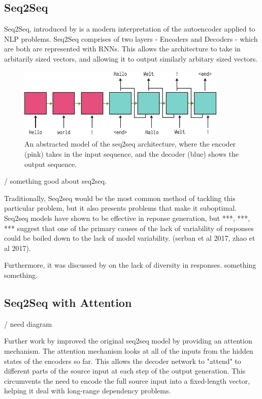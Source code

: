 \documentclass[12pt,twoside]{report}
\begin{document}
\subsection{Seq2Seq}

Seq2Seq, introduced by \cite{sutskever_sequence_2014} is a modern interpretation of the autoencoder applied to NLP problems. Seq2Seq comprises of two layers - Encoders and Decoders - which are both are represented with RNNs. This allows the architecture to take in arbitarily sized vectors, and allowing it to output similarly arbitary sized vectors.

\begin{figure}[!ht]
      
	\centering
	\includegraphics[width=100mm]{diagrams/seq2seq.pdf}
	\caption{An abstracted model of the seq2seq architecture, where the encoder (pink) takes in the input sequence, and the decoder (blue) shows the output sequence.\label{seq2seq}}
  \end{figure}

/ something good about seq2seq.

Traditionally, Seq2seq would be the most common method of tackling this particular problem, but it also presents problems that make it suboptimal. Seq2seq models have shown to be effective in reponse generation, but ***, ***, *** suggest that one of the primary causes of the lack of variability of responses could be boiled down to the lack of model variability. (serban et al 2017, zhao et al 2017).

Furthermore, it was discussed by \cite{jiang_why_2018} on the lack of diversity in responses. something something.

\subsection{Seq2Seq with Attention}

/ need diagram

Further work by \cite{bahdanau_neural_2014} improved the original seq2seq model by providing an attention mechanism. The attention mechanism looks at all of the inputs from the hidden states of the encoders so far. This allows the decoder network to "attend" to different parts of the source input at each step of the output generation. This circumvents the need to encode the full source input into a fixed-length vector, helping it deal with long-range dependency problems.
\end{document}
